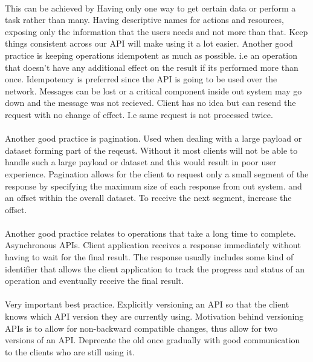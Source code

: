 \documentclass[a4paper, 11pt]{book}
\begin{document}
    \paragraph{}
    This can be achieved by
    Having only one way to get certain data or perform a task rather than many.
    Having descriptive names for actions and resources, exposing only the information that the users needs and not more than that.
    Keep things consistent across our API will make using it a lot easier.
    Another good practice is keeping operations idempotent as much as possible.
    i.e an operation that doesn't have any additional effect on the result if its performed more than once.
    Idempotency is preferred since the API is going to be used over the network.
    Messages can be lost or a critical component inside out system may go down and the message was not recieved.
    Client has no idea but can resend the request with no change of effect.
    I.e same request is not processed twice.

    \paragraph{}
    Another good practice is pagination.
    Used when dealing with a large payload or dataset forming part of the reqeust.
    Without it most clients will not be able to handle such a large payload or dataset and this would result in poor user experience.
    Pagination allows for the client to request only a small segment of the response by specifying the maximum size of each response from out system.
    and an offset within the overall dataset.
    To receive the next segment, increase the offset.

    \paragraph{}
    Another good practice relates to operations that take a long time to complete.
    Asynchronous APIs.
    Client application receives a response immediately without having to wait for the final result.
    The response usually includes some kind of identifier that allows the client application to track the progress and status of an operation and eventually receive the final result.

    \paragraph{}
    Very important best practice.
    Explicitly versioning an API so that the client knows which API version they are currently using.
    Motivation behind versioning APIs is to allow for non-backward compatible changes, thus allow for two versions of an API.
    Deprecate the old once gradually with good communication to the clients who are still using it.
\end{document}
